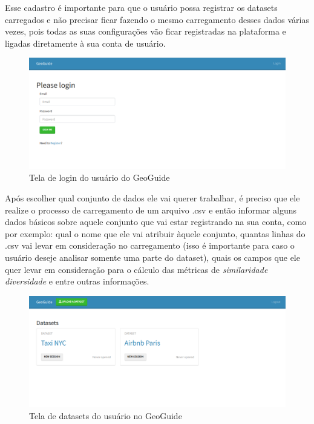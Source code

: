 Esse cadastro é importante para que o usuário possa registrar os datasets carregados e não precisar ficar fazendo o mesmo carregamento desses dados várias vezes, pois todas as suas configurações vão ficar registradas na plataforma e ligadas diretamente à sua conta de usuário.

\begin{figure}[h]
	\centering
	\includegraphics[width=\textwidth]{images/geoguide-login.png}
	\caption{Tela de login do usuário do GeoGuide}
	\label{fig:geoguide-login}
	\vspace{-10pt}
\end{figure}

Após escolher qual conjunto de dados ele vai querer trabalhar, é preciso que ele realize o processo de carregamento de um arquivo .csv e então informar alguns dados básicos sobre aquele conjunto que vai estar registrando na sua conta, como por exemplo: qual o nome que ele vai atribuir àquele conjunto, quantas linhas do .csv vai levar em consideração no carregamento (isso é importante para caso o usuário deseje analisar somente uma parte do dataset), quais os campos que ele quer levar em consideração para o cálculo das métricas de \textit{similaridade} \textit{diversidade} e entre outras informações.

\begin{figure}[h]
	\centering
	\includegraphics[width=\textwidth]{images/geoguide-datasets.png}
	\caption{Tela de datasets do usuário no GeoGuide}
	\label{fig:geoguide-datasets}
	\vspace{-10pt}
\end{figure}

